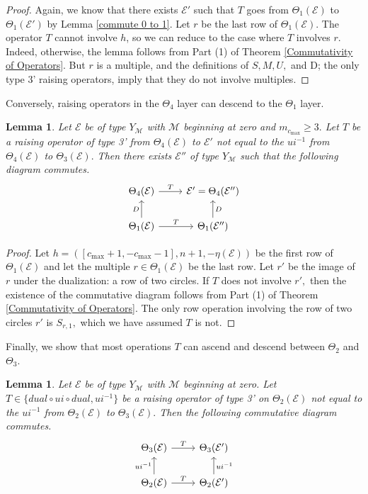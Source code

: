 \documentclass[11pt,letterpaper]{amsart}
\newcommand{\EE}{\mathcal{E}}
\newtheorem{lemma}[thm]{Lemma}
\numberwithin{equation}{section}
\begin{document}
\begin{proof}
    Again, we know that there exists $\EE'$ such that $T$ goes from $\Theta_1(\EE)$ to $\Theta_1(\EE')$ by Lemma \ref{commute 0 to 1}. Let $r$ be the last row of  $\Theta_1(\EE)$. The operator $T$ cannot involve $h$, so we can reduce to the case where $T$ involves $r$. Indeed, otherwise, the lemma follows from Part (1) of Theorem \ref{Commutativity of Operators}. But $r$ is a multiple, and the definitions of $S, M, U,$ and D; the only type 3' raising operators, imply that they do not involve multiples.
\end{proof}

Conversely, raising operators in the $\Theta_4$ layer can descend to the $\Theta_1$ layer.


\begin{lemma}
\label{commute 4 to 1}
    Let $\EE$ be of type $Y_\mathcal{M}$ with $\mathcal{M}$ beginning at zero and $m_{c_{\max}} \geq 3.$ Let $T$ be a raising operator of type 3' from $\Theta_4(\EE)$ to $\EE'$ not equal to the $ui^{-1}$ from $\Theta_4(\EE)$ to $\Theta_3(\EE).$ Then there exists $\EE''$ of type $Y_\mathcal{M}$ such that the following diagram commutes.
\[\begin{tikzcd}
	{\Theta_4(\EE)} & {\EE' = \Theta_4(\EE'')} \\
	{\Theta_1(\EE)} & {\Theta_1(\EE'')}
	\arrow["T", from=1-1, to=1-2]
	\arrow["{D}", from=2-1, to=1-1]
	\arrow["T", from=2-1, to=2-2]
	\arrow["{D}"', from=2-2, to=1-2]
\end{tikzcd}\]
\end{lemma}

\begin{proof}
    Let $h = ([c_{\max} + 1, -c_{\max} - 1], n + 1, -\eta(\EE))$ be the first row of $\Theta_1(\EE)$ and let the multiple $r \in \Theta_1(\EE)$ be the last row. Let $r'$ be the image of $r$ under the dualization: a row of two circles. If $T$ does not involve $r',$ then the existence of the commutative diagram follows from Part (1) of Theorem \ref{Commutativity of Operators}. The only row operation involving the row of two circles $r'$ is $S_{r, 1},$ which we have assumed $T$ is not.
\end{proof}

Finally, we show that most operations $T$ can ascend and descend between $\Theta_2$ and $\Theta_3.$

\begin{lemma}
\label{commute 2 to 3}
    Let $\EE$ be of type $Y_\mathcal{M}$ with $\mathcal{M}$ beginning at zero. Let $T \in \{dual \circ ui \circ dual, ui^{-1}\}$ be a raising operator of type 3' on $\Theta_2(\EE)$ not equal to the $ui^{-1}$ from $\Theta_2(\EE)$ to $\Theta_3(\EE).$ Then the following commutative diagram commutes.
    \[\begin{tikzcd}
	{\Theta_3(\EE)} & {\Theta_3(\EE')} \\
	{\Theta_2(\EE)} & {\Theta_2(\EE')}
	\arrow["T", from=1-1, to=1-2]
	\arrow["{ui^{-1}}", from=2-1, to=1-1]
	\arrow["T", from=2-1, to=2-2]
	\arrow["{ui^{-1}}"', from=2-2, to=1-2]
\end{tikzcd}\]
\end{lemma}
\end{document}
